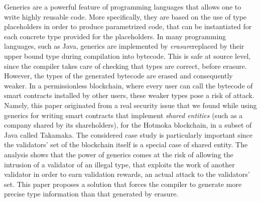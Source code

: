 Generics are a powerful feature of programming languages that allows one
to write highly reusable code.
%
More specifically, they are based on the use of type placeholders in order
to produce parametrized code, that can be instantiated for each
concrete type provided for the placeholders.
%
In many programming languages, such as Java, generics are implemented by
\emph{erasure}\ie replaced by their upper bound type during compilation into bytecode.
This is safe at source level, since the compiler takes care of checking that
types are correct, before erasure. However, the types of the generated bytecode
are erased and consequently weaker. In a permissionless blockchain, where
every user can call the bytecode of smart contracts installed by other users,
these weaker types pose a risk of attack.
%
Namely, this paper originated from a real security issue that we found
while using generics for writing
smart contracts that implement
\emph{shared entities} (such as a company shared by its shareholders),
for the Hotmoka blockchain, in a subset of Java called Takamaka.
%
The considered case study is particularly important since
the validators' set of the blockchain itself is
a special case of shared entity.
The analysis shows that the power of generics comes at the risk of
allowing the intrusion of
a validator of an illegal type, that exploits the work of another
validator in order to earn validation rewards, an actual attack
to the validators' set. This paper proposes a solution
that forces the compiler to generate more precise type information than
that generated by erasure.

